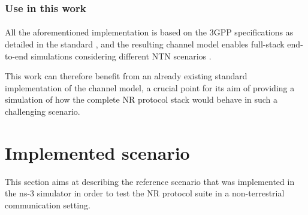\subsubsection{Use in this work}
\paragraph{}
All the aforementioned implementation is based on the \ac{3GPP} specifications as detailed in the standard \cite{3gpp-tr-38.811}, and the resulting channel model enables full-stack end-to-end simulations considering different \ac{NTN} scenarios \cite{Sandri_2023}.

This work can therefore benefit from an already existing standard implementation of the channel model, a crucial point for its aim of providing a simulation of how the complete \ac{NR} protocol stack would behave in such a challenging scenario. 

\section{Implemented scenario}

This section aims at describing the reference scenario that was implemented in the ns-3 simulator in order to test the \ac{NR} protocol suite in a non-terrestrial communication setting.

